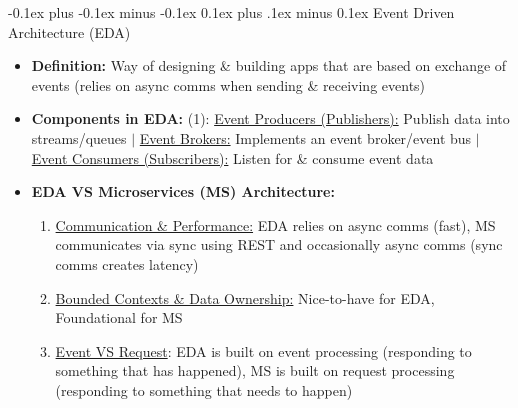 \documentclass[landscape]{article}
\makeatletter
\renewcommand{\subsection}{\@startsection{subsection}{2}{0mm}%
  {-0.1ex plus -0.1ex minus -0.1ex}%
  {0.1ex plus .1ex minus 0.1ex}%
{\normalfont\scriptsize\bfseries}}
\makeatother
\begin{document}
\begin{multicols*}{5}
    \subsection{Event Driven Architecture (EDA)}
    \begin{itemize}
      \item \textbf{Definition:} Way of designing \& building apps that are based on exchange of events (relies on async comms when sending \& receiving events)
      \item \textbf{Components in EDA:} (1): \underline{Event Producers (Publishers):} Publish data into streams/queues $|$ \underline{Event Brokers:} Implements an event broker/event bus $|$ \underline{Event Consumers (Subscribers):} Listen for \& consume event data
      \item \textbf{EDA VS Microservices (MS) Architecture:}
      \begin{enumerate}
        \item \underline{Communication \& Performance:} EDA relies on async comms (fast), MS communicates via sync using REST and occasionally async comms (sync comms creates latency)
        \item \underline{Bounded Contexts \& Data Ownership:} Nice-to-have for EDA, Foundational for MS
        \item \underline{Event VS Request}: EDA is built on event processing (responding to something that has happened), MS is built on request processing (responding to something that needs to happen)
      \end{enumerate}
    \end{itemize}


\end{multicols*}
\end{document}
